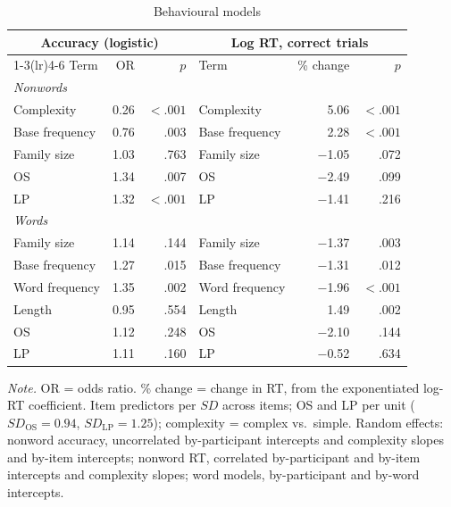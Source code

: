 \begin{table}[htbp]
\centering
\caption{Behavioural models}
\label{tab:behaviour}
\begin{tabular}{lrrlrr}
\toprule
\multicolumn{3}{c}{Accuracy (logistic)} & \multicolumn{3}{c}{Log RT, correct trials} \\
\cmidrule(lr){1-3}\cmidrule(lr){4-6}
Term & OR & $p$ & Term & \% change & $p$ \\
\midrule
\multicolumn{6}{l}{\textit{Nonwords}} \\
Complexity      & 0.26 & $<.001$ & Complexity      & 5.06    & $<.001$ \\
Base frequency  & 0.76 & .003    & Base frequency  & 2.28    & $<.001$ \\
Family size     & 1.03 & .763    & Family size     & $-$1.05 & .072 \\
OS              & 1.34 & .007    & OS              & $-$2.49 & .099 \\
LP              & 1.32 & $<.001$ & LP              & $-$1.41 & .216 \\
\multicolumn{6}{l}{\textit{Words}} \\
Family size     & 1.14 & .144    & Family size     & $-$1.37 & .003 \\
Base frequency  & 1.27 & .015    & Base frequency  & $-$1.31 & .012 \\
Word frequency  & 1.35 & .002    & Word frequency  & $-$1.96 & $<.001$ \\
Length          & 0.95 & .554    & Length          & 1.49    & .002 \\
OS              & 1.12 & .248    & OS              & $-$2.10 & .144 \\
LP              & 1.11 & .160    & LP              & $-$0.52 & .634 \\
\bottomrule
\end{tabular}

\vspace{2pt}
\begin{minipage}{0.85\linewidth}\footnotesize
\textit{Note.} OR = odds ratio. \% change = change in RT, from the exponentiated
log-RT coefficient. Item predictors per $SD$ across items; OS and LP per unit
($SD_{\text{OS}} = 0.94$, $SD_{\text{LP}} = 1.25$); complexity = complex vs.\
simple. Random effects: nonword accuracy, uncorrelated by-participant intercepts
and complexity slopes and by-item intercepts; nonword RT, correlated
by-participant and by-item intercepts and complexity slopes; word models,
by-participant and by-word intercepts.
\end{minipage}
\end{table}

